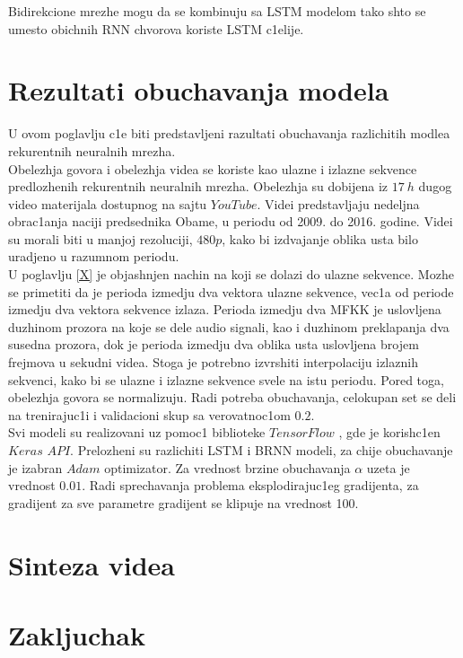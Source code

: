 \documentclass[a4paper, openany, oneside, 11pt]{book}
\begin{document}
Bidirekcione mrezhe mogu da se kombinuju sa \acrshort{LSTM} modelom tako shto se umesto obichnih \acrshort{RNN} chvorova koriste \acrshort{LSTM} c1elije.
\chapter{Rezultati obuchavanja modela}
U ovom poglavlju c1e biti predstavljeni razultati obuchavanja razlichitih modlea rekurentnih neuralnih mrezha.\\
Obelezhja govora i obelezhja videa se koriste kao ulazne i izlazne sekvence predlozhenih rekurentnih neuralnih mrezha. Obelezhja su dobijena iz $\SI{17}{h}$ dugog video materijala dostupnog na sajtu $YouTube$. Videi predstavljaju nedeljna obrac1anja naciji predsednika Obame, u periodu od 2009. do 2016. godine. Videi su morali biti u manjoj rezoluciji, $480p$, kako bi izdvajanje oblika usta bilo uradjeno u razumnom periodu.\\
U poglavlju \ref{X} je objash\-njen nachin na koji se dolazi do ulazne sekvence. Mozhe se primetiti da je perioda izmedju dva vektora ulazne sekvence, vec1a od periode izmedju dva vektora sekvence izlaza. Perioda izmedju dva \acrshort{MFKK} je uslovljena duzhinom prozora na koje se dele audio signali, kao i duzhinom preklapanja dva susedna prozora, dok je perioda izmedju dva oblika usta uslovljena brojem frejmova u sekudni videa. Stoga je potrebno  izvrshiti interpolaciju izlaznih sekvenci, kako bi se ulazne i izlazne sekvence svele na istu periodu. Pored toga, obelezhja govora se normalizuju. Radi potreba obuchavanja, celokupan set se deli na trenirajuc1i i validacioni skup sa verovatnoc1om $0.2$.\\
Svi modeli su realizovani uz pomoc1 biblioteke $TensorFlow$ \cite{TF}, gde je korish\-c1en $Keras$ $API$. Prelozheni su razlichiti \acrshort{LSTM} i \acrshort{BRNN} modeli, za chije obuchavanje je izabran $Adam$ \cite{Adam} optimizator. Za vrednost brzine obuchavanja $\alpha$ uzeta je vrednost $0.01$. Radi sprechavanja problema eksplodirajuc1eg gradijenta, za gradijent za sve parametre gradijent se klipuje na vrednost 100.

\chapter{Sinteza videa}
\chapter{Zakljuchak}
\end{document}
